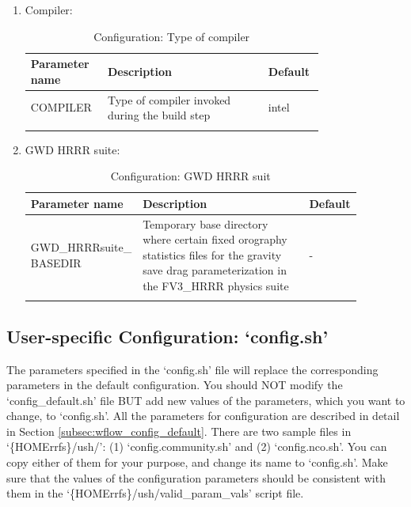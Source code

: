\documentclass[11pt,fleqn]{report}              %
\begin{document}
\begin{enumerate}
\item Compiler:
{
\scriptsize
\begin{longtable}{ p{0.17\linewidth} | p{0.5\linewidth} | p{0.1\linewidth}}
\hline
\hline
 Parameter name & Description & Default \\
\hline
 COMPILER & Type of compiler invoked during the build step & intel \\
\hline
\caption{Configuration: Type of compiler}
\label{table:config_compiler}
\end{longtable}
}

\item GWD HRRR suite:
{
\scriptsize
\begin{longtable}{ p{0.17\linewidth} | p{0.63\linewidth} | p{0.07\linewidth}}
\hline
\hline
 Parameter name & Description & Default \\
\hline
 GWD\_HRRRsuite\_ BASEDIR & Temporary base directory where certain fixed orography statistics files for the gravity save drag parameterization in the FV3\_HRRR physics suite  & - \\
\hline
\caption{Configuration: GWD HRRR suit}
\label{table:config_gwd_hrrr}
\end{longtable}
}


\end{enumerate}



\subsection{User-specific Configuration: `config.sh'}
\label{subsec:wflow_config_new}

The parameters specified in the `config.sh' file will replace the corresponding parameters in the default configuration. You should NOT modify the `config\_default.sh' file BUT add new values of the parameters, which you want to change, to `config.sh'. All the parameters for configuration are described in detail in Section \ref{subsec:wflow_config_default}. There are two sample files in `\{HOMErrfs\}/ush/': (1) `config.community.sh' and (2) `config.nco.sh'. You can copy either of them for your purpose, and change its name to `config.sh'. Make sure that the values of the configuration parameters should be consistent with them in the `\{HOMErrfs\}/ush/valid\_param\_vals' script file. 

\vspace{0.1cm}
\end{document}
